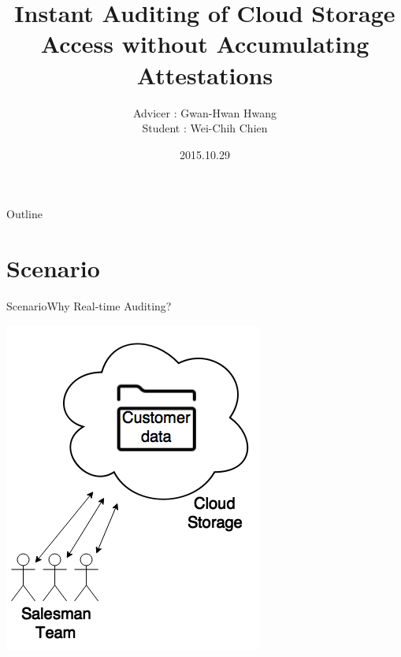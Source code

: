 \documentclass{beamer}
\title[Progress Report]{Instant Auditing of Cloud Storage Access without Accumulating Attestations}
\author[Wei-Chih Chien]{Advicer : Gwan-Hwan Hwang\\ Student : Wei-Chih Chien}
\institute[NTNU CSIE CCLAB]{NTNU CSIE CCLAB}
\date{2015.10.29}
\begin{document}
\begin{CJK}{UTF8}{bkai}
\begin{frame}
  \titlepage
\end{frame}

\begin{frame}{Outline}
  \tableofcontents
\end{frame}

\section{Scenario}
\begin{frame}{Scenario}{Why Real-time Auditing?}
	\begin{center}
	\includegraphics[width=.4\textwidth]{Scenario1.png}
	\end{center}
\end{frame}


\end{CJK}
\end{document}
